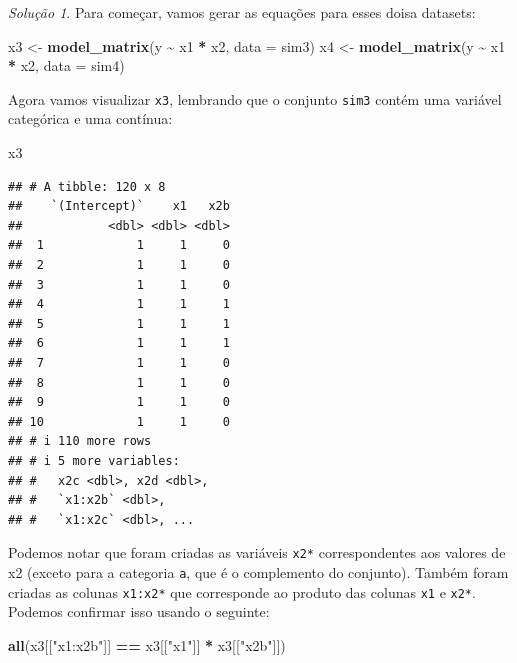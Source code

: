 \documentclass[
]{latex/krantz}
\newenvironment{Shaded}{\begin{snugshade}}{\end{snugshade}}
\newcommand{\AttributeTok}[1]{\textcolor[rgb]{0.13,0.29,0.53}{#1}}
\newcommand{\FunctionTok}[1]{\textcolor[rgb]{0.13,0.29,0.53}{\textbf{#1}}}
\newcommand{\NormalTok}[1]{#1}
\newcommand{\OtherTok}[1]{\textcolor[rgb]{0.56,0.35,0.01}{#1}}
\newcommand{\SpecialCharTok}[1]{\textcolor[rgb]{0.81,0.36,0.00}{\textbf{#1}}}
\newcommand{\StringTok}[1]{\textcolor[rgb]{0.31,0.60,0.02}{#1}}
\theoremstyle{definition}
\theoremstyle{definition}
\theoremstyle{definition}
\theoremstyle{definition}
\theoremstyle{remark}
\newtheorem*{solution}{Solução}
\begin{document}
\begin{solution}
Para começar, vamos gerar as equações para esses doisa datasets:

\begin{Shaded}
\begin{Highlighting}[]
\NormalTok{x3 }\OtherTok{\textless{}{-}} \FunctionTok{model\_matrix}\NormalTok{(y }\SpecialCharTok{\textasciitilde{}}\NormalTok{ x1 }\SpecialCharTok{*}\NormalTok{ x2, }\AttributeTok{data =}\NormalTok{ sim3)}
\NormalTok{x4 }\OtherTok{\textless{}{-}} \FunctionTok{model\_matrix}\NormalTok{(y }\SpecialCharTok{\textasciitilde{}}\NormalTok{ x1 }\SpecialCharTok{*}\NormalTok{ x2, }\AttributeTok{data =}\NormalTok{ sim4)}
\end{Highlighting}
\end{Shaded}

Agora vamos visualizar \texttt{x3}, lembrando que o conjunto \texttt{sim3} contém uma variável categórica e uma contínua:

\begin{Shaded}
\begin{Highlighting}[]
\NormalTok{x3}
\end{Highlighting}
\end{Shaded}

\begin{verbatim}
## # A tibble: 120 x 8
##    `(Intercept)`    x1   x2b
##            <dbl> <dbl> <dbl>
##  1             1     1     0
##  2             1     1     0
##  3             1     1     0
##  4             1     1     1
##  5             1     1     1
##  6             1     1     1
##  7             1     1     0
##  8             1     1     0
##  9             1     1     0
## 10             1     1     0
## # i 110 more rows
## # i 5 more variables:
## #   x2c <dbl>, x2d <dbl>,
## #   `x1:x2b` <dbl>,
## #   `x1:x2c` <dbl>, ...
\end{verbatim}

Podemos notar que foram criadas as variáveis \texttt{x2*} correspondentes aos valores de x2 (exceto para a categoria \texttt{a}, que é o complemento do conjunto). Também foram criadas as colunas \texttt{x1:x2*} que corresponde ao produto das colunas \texttt{x1} e \texttt{x2*}. Podemos confirmar isso usando o seguinte:

\begin{Shaded}
\begin{Highlighting}[]
\FunctionTok{all}\NormalTok{(x3[[}\StringTok{"x1:x2b"}\NormalTok{]] }\SpecialCharTok{==}\NormalTok{ x3[[}\StringTok{"x1"}\NormalTok{]] }\SpecialCharTok{*}\NormalTok{ x3[[}\StringTok{"x2b"}\NormalTok{]])}
\end{Highlighting}
\end{Shaded}


\end{solution}
\end{document}
